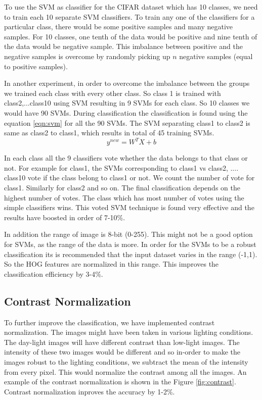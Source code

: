 \documentclass{article} %
\begin{document}
	To use the SVM as classifier for the CIFAR dataset which has 10 classes, we need to train each 10 separate SVM classifiers. To train any one of the classifiers for a particular class, there would be some positive samples and many negative samples. For 10 classes, one tenth of the data would be positive and nine tenth of the data would be negative sample. This imbalance between positive and the negative samples is overcome by randomly picking up  $n$ negative samples (equal to positive samples).
	
	In another experiment, in order to overcome the imbalance between the groups we trained each class with every other class. So class 1 is trained with class2,...class10 using SVM resulting in 9 SVMs for each class. So 10 classes we would have 90 SVMs. During classification the classification is found using the equation \ref{eqn:svm} for all the 90 SVMs. The SVM separating class1 to class2 is same as class2 to class1, which results in total of 45 training SVMs.
	\begin{equation}
	\label{eqn:svm}
		y^{new} = W^T X + b	
	\end{equation}
	
In each class all the 9 classifiers vote whether the data belongs to that class or not. For example for class1, the SVMs corresponding to class1 vs class2, .... class10 vote if the class belong to class1 or not. We count the number of vote for class1. Similarly for class2 and so on. The final classification depends on the highest number of votes. The class which has most number of votes using the simple classifiers wins. This voted SVM technique is found very effective and the results have boosted in order of 7-10\%.

In addition the range of image is 8-bit (0-255). This might not be a good option for SVMs, as the range of the data is more. In order for the SVMs to be a robust classification its is recommended that the input dataset varies in the range (-1,1). So the HOG features are normalized in this range. This improves the classification efficiency by 3-4\%.
\subsection{Contrast Normalization}

To further improve the classification, we have implemented contrast normalization. The images might have been taken in various lighting conditions. The day-light images will have different contrast than low-light images. The intensity of these two images would be different and so in-order to make the images robust to the lighting conditions, we subtract the mean of the intensity from every pixel. This would normalize the contrast among all the images. An example of the contrast normalization is shown in the Figure \ref{fig:contrast}. Contrast normalization inproves the accuracy by 1-2\%.
\end{document}

